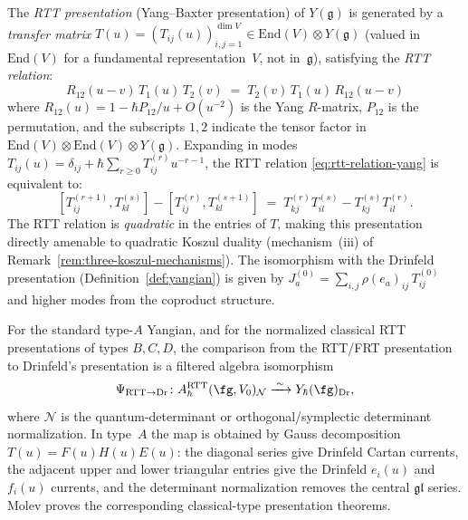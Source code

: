 \begin{definition}\label{def:yangian-rtt}
The \emph{RTT presentation} (Yang--Baxter presentation) of
$Y(\mathfrak{g})$ is generated by a \emph{transfer matrix}
$T(u) = (T_{ij}(u))_{i,j=1}^{\dim V}
\in \mathrm{End}(V) \otimes Y(\mathfrak{g})$
(valued in $\mathrm{End}(V)$ for a fundamental representation~$V$,
not in~$\mathfrak{g}$), satisfying the \emph{RTT relation}:
\begin{equation}\label{eq:rtt-relation-yang}%
R_{12}(u-v)\, T_1(u)\, T_2(v)
\;=\; T_2(v)\, T_1(u)\, R_{12}(u-v)
\end{equation}
where $R_{12}(u) = 1 - \hbar P_{12}/u + O(u^{-2})$ is the
Yang $R$-matrix, $P_{12}$ is the permutation, and the subscripts
$1, 2$ indicate the tensor factor in
$\mathrm{End}(V) \otimes \mathrm{End}(V) \otimes Y(\mathfrak{g})$.
Expanding in modes
$T_{ij}(u) = \delta_{ij} + \hbar \sum_{r \geq 0} T_{ij}^{(r)} u^{-r-1}$,
the RTT relation \eqref{eq:rtt-relation-yang} is equivalent to:
\begin{equation}\label{eq:rtt-modes}
[T_{ij}^{(r+1)}, T_{kl}^{(s)}]
- [T_{ij}^{(r)}, T_{kl}^{(s+1)}]
\;=\; T_{kj}^{(r)} T_{il}^{(s)}
- T_{kj}^{(s)} T_{il}^{(r)}.
\end{equation}
The RTT relation is \emph{quadratic} in the entries of $T$, making
this presentation directly amenable to quadratic Koszul duality
(mechanism~(iii) of Remark~\ref{rem:three-koszul-mechanisms}).
The isomorphism with the Drinfeld presentation
(Definition~\ref{def:yangian}) is given by
$J_a^{(0)} = \sum_{i,j} \rho(e_a)_{ij}\, T_{ij}^{(0)}$
and higher modes from the coproduct structure.
\end{definition}

\begin{proposition}
\label{prop:drinfeld-rtt-presentation-comparison}
For the standard type-$A$ Yangian, and for the normalized classical
RTT presentations of types $B,C,D$, the comparison from the RTT/FRT
presentation to Drinfeld's presentation is a filtered algebra
isomorphism
\[
\Psi_{\mathrm{RTT}\to\mathrm{Dr}}\colon
A^{\mathrm{RTT}}_\hbar(\fg,V_0)_{\mathcal N}
\xrightarrow{\;\sim\;}
Y_\hbar(\fg)_{\mathrm{Dr}},
\]
where $\mathcal N$ is the quantum-determinant or
orthogonal/symplectic determinant normalization.  In type~$A$ the map
is obtained by Gauss decomposition
$T(u)=F(u)H(u)E(u)$: the diagonal series give Drinfeld Cartan
currents, the adjacent upper and lower triangular entries give the
Drinfeld $e_i(u)$ and $f_i(u)$ currents, and the determinant
normalization removes the central $\mathfrak{gl}$ series.  Molev
\cite[Theorems~3.2.1, 4.2.1, 4.3.1, 4.4.1]{molev-yangians}
proves the corresponding classical-type presentation theorems.
\end{proposition}

